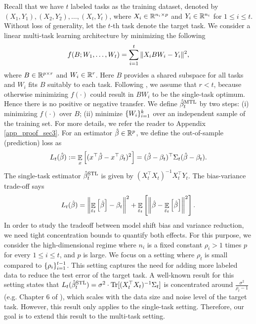 Recall that we have $t$ labeled tasks as the training dataset, denoted by $(X_1, Y_1), (X_2, Y_2), \dots, (X_t, Y_t)$, where $X_i\in\mathbb{R}^{n_i\times p}$ and $Y_i\in\mathbb{R}^{n_i}$ for $1\le i\le t$.
Without loss of generality, let the $t$-th task denote the target task.
We consider a linear multi-task learning architecture by minimizing the following
\begin{align}
	\label{eq_mtl}
	f(B; W_1, \dots, W_t) = \sum_{i=1}^t \|X_i B W_i - Y_i\|^2,
\end{align}
where $B\in\mathbb{R}^{p\times r}$ and $W_i\in\mathbb{R}^r$.
Here $B$ provides a shared subspace for all tasks and $W_i$ fits $B$ suitably to each task.
Following \cite{WZR20}, we assume that $r < t$, because otherwise minimizing $f(\cdot)$ could result in $BW_i$ to be the single-task optimum.
Hence there is no positive or negative transfer.
We define $\hat{\beta}_t^{\text{MTL}}$ by two steps:
(i) minimizing $f(\cdot)$ over $B$;
(ii) minimize $\{W_i\}_{i=1}^k$ over an independent sample of the training set.
For more details, we refer the reader to Appendix \ref{app_proof_sec3}.
For an estimator $\hat{\beta}\in\mathbb{R}^p$, we define the out-of-sample (prediction) loss as
	\begin{align*}
		L_t(\hat{\beta}) := \mathop{\mathbb{E}}_{x}\left[ ({x}^{\top}\hat{\beta} - {x}^{\top}\beta_t)^2 \right]
		= (\hat{\beta} - \beta_t)^{\top}\Sigma_t(\hat{\beta} - \beta_t).
	\end{align*}
The single-task estimator $\hat{\beta}_t^{\text{STL}}$ is given by $(X_t^{\top}X_t)^{-1}X_t^{\top}Y_t$.
The bias-variance trade-off \cite{HTF09} says
	\[ L_t(\hat{\beta}) =
		\left\| \mathop{\mathbb{E}}_{\varepsilon_t}\left[ \hat{\beta} \right] - \beta_t \right\|^2 + \mathop{\mathbb{E}}_{\varepsilon_t}\left[ \left\| \hat{\beta} - \mathop{\mathbb{E}}_{\varepsilon_t}\left[ \hat{\beta} \right] \right\|^2 \right]. \]
In order to study the tradeoff between model shift bias and variance reduction, we need tight concentration bounds to quantify both effects.
For this purpose, we consider the high-dimensional regime where $n_i$ is a fixed constant $\rho_i > 1$ times $p$ for every $1\le i\le t$, and $p$ is large.
We focus on a setting where $\rho_t$ is small compared to $\{\rho_i\}_{i=1}^{t-1}$.
This setting captures the need for adding more labeled data to reduce the test error of the target task.
A well-known result for this setting states that $L_t(\hat{\beta}_t^{\text{STL}}) = \sigma^2 \cdot \operatorname{Tr}[(X_t^{\top}X_t)^{-1}\Sigma_t]$ is concentrated around $\frac {\sigma^2} {\rho_t - 1}$ (e.g. Chapter 6 of \cite{S07}), which scales with the data size and noise level of the target task.
However, this result only applies to the single-task setting.
Therefore, our goal is to extend this result to the multi-task setting.

